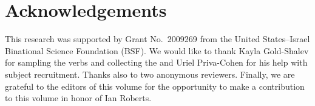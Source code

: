 \documentclass[output=paper]{langsci/langscibook}
\begin{document}
\printchapterglossary{}

\section*{Acknowledgements}

This research was supported by Grant No.\ 2009269 from the United States–Israel
Binational Science Foundation (BSF). We would like to thank Kayla Gold-Shalev
for sampling the verbs and collecting the  and Uriel Priva-Cohen for his
help with subject recruitment. Thanks also to two anonymous reviewers. Finally,
we are grateful to the editors of this volume for the opportunity to make a
contribution to this volume in honor of Ian Roberts.

{\sloppy
\printbibliography[heading=subbibliography,notkeyword=this]
}
\end{document}
